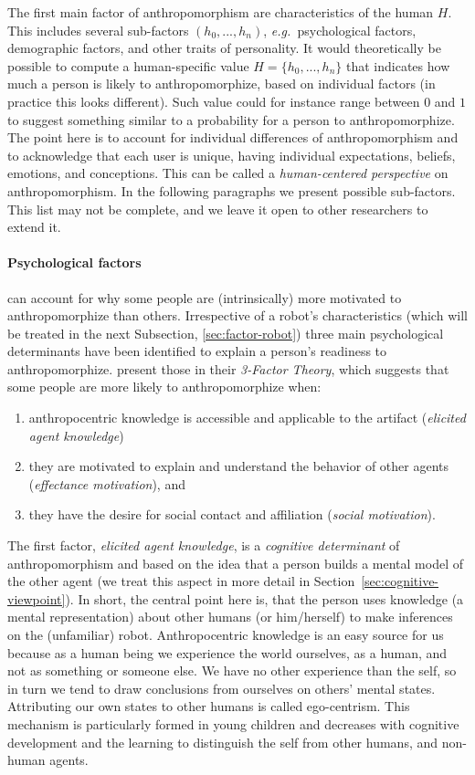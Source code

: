 \documentclass{frontiersSCNS} %
\newcommand{\eg}{{\textit{e.g.~}}}
\begin{document}
The first main factor of anthropomorphism are characteristics of the human $H$. This includes several sub-factors $(h_0, ... , h_n)$, \eg psychological factors, demographic factors, and other traits of personality. 
It would theoretically be possible to compute a human-specific value $H=\{h_0, ... , h_n\}$ that indicates how much a person is likely to anthropomorphize, based on individual factors (in practice this looks different). Such value could for instance range between $0$ and $1$ to suggest something similar to a probability for a person to anthropomorphize.
The point here is to account for individual differences of anthropomorphism and to acknowledge that each user is unique, having individual expectations, beliefs, emotions, and conceptions. This can be called a \textit{human-centered perspective} on anthropomorphism. 
In the following paragraphs we present possible sub-factors. This list may not be complete, and we leave it open to other researchers to extend it.
 
\paragraph{Psychological factors} can account for why some people are (intrinsically) more motivated to anthropomorphize than others. Irrespective of a robot's characteristics (which will be treated in the next Subsection, \ref{sec:factor-robot}) three main psychological determinants have been identified to explain a person's readiness to anthropomorphize. \cite{epley_seeing_2007} present those in their \textit{3-Factor Theory}, which suggests that some people are more likely to anthropomorphize when:

\begin{enumerate}
\item anthropocentric knowledge is accessible and applicable to the artifact (\textit{elicited agent knowledge})
\item they are motivated to explain and understand the behavior of other agents (\textit{effectance motivation}), and
\item they have the desire for social contact and affiliation (\textit{social motivation}).
\end{enumerate}

The first factor, \textit{elicited agent knowledge}, is a \textit{cognitive determinant} of anthropomorphism and based on the idea that a person builds a mental model of the other agent (we treat this aspect in more detail in Section~\ref{sec:cognitive-viewpoint}). In short, the central point here is, that the person uses knowledge (a mental representation) about other humans (or him/herself) to make inferences on the (unfamiliar) robot. Anthropocentric knowledge is an easy source for us because as a human being we experience the world ourselves, as a human, and not as something or someone else. We have no other experience than the self, so in turn we tend to draw conclusions from ourselves on others' mental states. Attributing our own states to other humans is called ego-centrism. This mechanism is particularly formed in young children and decreases with cognitive development and the learning to distinguish the self from other humans, and non-human agents.
\end{document}
